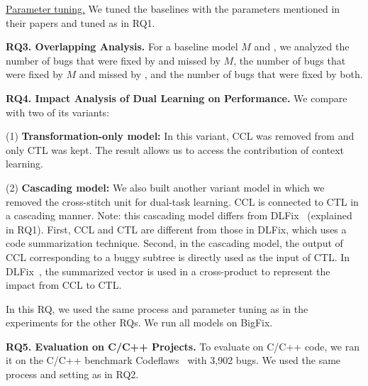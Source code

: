 \underline{Parameter tuning.} We tuned the baselines with the
parameters mentioned in their papers and tuned {\tool} as in RQ1.


{\bf RQ3. Overlapping Analysis.} For a baseline model $M$ and {\tool},
we analyzed the number of bugs that were fixed by {\tool}
and missed by $M$, the number of bugs that were fixed by $M$ and
missed by {\tool}, and the number of bugs that were fixed by
both.


{\bf RQ4. Impact Analysis of Dual Learning on Performance.}
We compare {\tool} with two of its variants:

(1) \textbf{Transformation-only model:} In this variant,
CCL was removed from {\tool} and only CTL was kept. The result
allows us to access the contribution of context learning.


(2) \textbf{Cascading model:} We also built another variant model in
which we removed the cross-stitch unit for dual-task learning. CCL is
connected to CTL in a cascading manner.
Note: this cascading model differs from DLFix~\cite{icse20} (explained
in RQ1). First, CCL and CTL are different from those in DLFix, which
uses a code summarization technique. Second, in the cascading model,
the output of CCL corresponding to a buggy subtree is directly used as
the input of CTL. In DLFix~\cite{icse20}, the summarized vector is
used in a cross-product to represent the impact from CCL to CTL.



In this RQ, we used the same process and parameter tuning as in the
experiments for the other RQs. We run all models on BigFix.


{\bf RQ5. Evaluation on C/C++ Projects.}  To evaluate {\tool} on C/C++
code, we ran it on the C/C++ benchmark
Codeflaws~\cite{tan2017codeflaws} with 3,902 bugs. 
We used the same process and setting as in RQ2.

